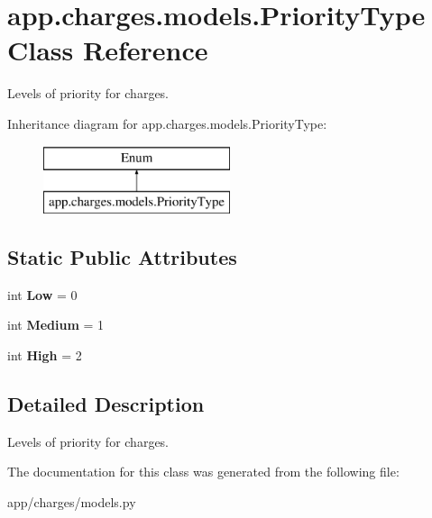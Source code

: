 \hypertarget{classapp_1_1charges_1_1models_1_1_priority_type}{}\section{app.\+charges.\+models.\+Priority\+Type Class Reference}
\label{classapp_1_1charges_1_1models_1_1_priority_type}


Levels of priority for charges.  


Inheritance diagram for app.\+charges.\+models.\+Priority\+Type\+:\begin{figure}[H]
\begin{center}
\leavevmode
\includegraphics[height=2.000000cm]{classapp_1_1charges_1_1models_1_1_priority_type}
\end{center}
\end{figure}
\subsection*{Static Public Attributes}
\begin{DoxyCompactItemize}
\item 
\mbox{\label{classapp_1_1charges_1_1models_1_1_priority_type_a677336d553eb0c071bf3545aba8653a8}} 
int {\bfseries Low} = 0
\item 
\mbox{\label{classapp_1_1charges_1_1models_1_1_priority_type_aa9276e7802525f37029da2ea258ca611}} 
int {\bfseries Medium} = 1
\item 
\mbox{\label{classapp_1_1charges_1_1models_1_1_priority_type_a024f234040f34676358bacbcf35981a7}} 
int {\bfseries High} = 2
\end{DoxyCompactItemize}


\subsection{Detailed Description}
Levels of priority for charges. 

The documentation for this class was generated from the following file\+:\begin{DoxyCompactItemize}
\item 
app/charges/models.\+py\end{DoxyCompactItemize}
